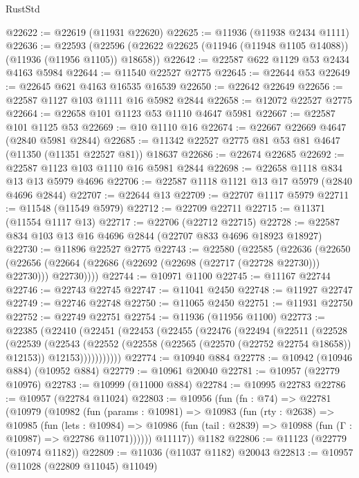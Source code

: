 \begin{lexlean}{RustStd}
\begin{coremodule}
@22622 := @22619 (@11931 @22620)
@22625 := @11936 (@11938 @2434 @1111)
@22636 := @22593
    (@22596 (@22622 @22625 (@11946 (@11948 @1105 @14088)) (@11936 (@11956 @1105)) @18658))
@22642 := @22587 @622 @1129 @53 @2434 @4163 @5984
@22644 := @11540 @22527 @2775
@22645 := @22644 @53
@22649 := @22645 @621 @4163 @16535 @16539
@22650 := @22642 @22649
@22656 := @22587 @1127 @103 @1111 @16 @5982 @2844
@22658 := @12072 @22527 @2775
@22664 := @22658 @101 @1123 @53 @1110 @4647 @5981
@22667 := @22587 @101 @1125 @53
@22669 := @10 @1110 @16
@22674 := @22667 @22669 @4647 (@2840 @5981 @2844)
@22685 := @11342 @22527 @2775 @81 @53 @81 @4647 (@11350 (@11351 @22527 @81)) @18637
@22686 := @22674 @22685
@22692 := @22587 @1123 @103 @1110 @16 @5981 @2844
@22698 := @22658 @1118 @834 @13 @13 @5979 @4696
@22706 := @22587 @1118 @1121 @13 @17 @5979 (@2840 @4696 @2844)
@22707 := @22644 @13
@22709 := @22707 @1117 @5979
@22711 := @11548 (@11549 @5979)
@22712 := @22709 @22711
@22715 := @11371 (@11554 @1117 @13)
@22717 := @22706 (@22712 @22715)
@22728 := @22587 @834 @103 @13 @16 @4696 @2844 (@22707 @833 @4696 @18923 @18927)
@22730 := @11896 @22527 @2775
@22743 := @22580
    (@22585
      (@22636
        (@22650
          (@22656 (@22664 (@22686 (@22692 (@22698 (@22717 (@22728 @22730))) @22730))) @22730))))
@22744 := @10971 @1100
@22745 := @11167 @22744
@22746 := @22743 @22745
@22747 := @11041 @2450
@22748 := @11927 @22747
@22749 := @22746 @22748
@22750 := @11065 @2450
@22751 := @11931 @22750
@22752 := @22749 @22751
@22754 := @11936 (@11956 @1100)
@22773 := @22385
    (@22410
      (@22451
        (@22453
          (@22455
            (@22476
              (@22494
                (@22511
                  (@22528
                    (@22539
                      (@22543
                        (@22552
                          (@22558 (@22565 (@22570 (@22752 @22754 @18658)) @12153))
                          @12153)))))))))))
@22774 := @10940 @884
@22778 := @10942 (@10946 @884) (@10952 @884)
@22779 := @10961 @20040
@22781 := @10957 (@22779 @10976)
@22783 := @10999 (@11000 @884)
@22784 := @10995 @22783
@22786 := @10957 (@22784 @11024)
@22803 := @10956
    (fun (fn : @74) =>
    @22781
      (@10979
        (@10982
          (fun (params : @10981) =>
          @10983
            (fun (rty : @2638) =>
            @10985
              (fun (lets : @10984) =>
              @10986 (fun (tail : @2839) => @10988 (fun (Γ : @10987) => @22786 @11071))))))
        @11117))
    @1182
@22806 := @11123 (@22779 (@10974 @1182))
@22809 := @11036 (@11037 @1182) @20043
@22813 := @10957 (@11028 (@22809 @11045) @11049)

\end{coremodule}
\end{lexlean}
